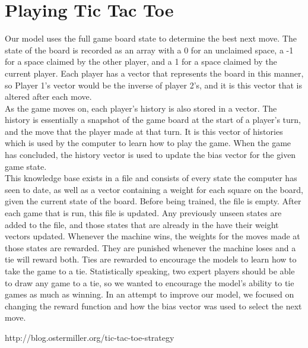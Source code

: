 \documentclass{article}
\begin{document}
\section{Playing Tic Tac Toe}
Our model uses the full game board state to determine the best next move. The state of the board is recorded as an array with a 0 for an unclaimed space, a -1 for a space claimed by the other player, and a 1 for a space claimed by the current player. Each player has a vector that represents the board in this manner, so Player 1's vector would be the inverse of player 2's, and it is this vector that is altered after each move. \\
As the game moves on, each player's history is also stored in a vector. The history is essentially a snapshot of the game board at the start of a player's turn, and the move that the player made at that turn. It is this vector of histories which is used by the computer to learn how to play the game. When the game has concluded, the history vector is used to update the bias vector for the given game state. \\
This knowledge base exists in a file and consists of every state the computer has seen to date, as well as a vector containing a weight for each square on the board, given the current state of the board. Before being trained, the file is empty. After each game that is run, this file is updated. Any previously unseen states are added to the file, and those states that are already in the have their weight vectors updated. Whenever the machine wins, the weights for the moves made at those states are rewarded. They are punished whenever the machine loses and a tie will reward both. Ties are rewarded to encourage the models to learn how to take the game to a tie. Statistically speaking, two expert players should be able to draw any game to a tie, so we wanted to encourage the model's ability to tie games as much as winning. In an attempt to improve our model, we focused on changing the reward function and how the bias vector was used to select the next move.  

http://blog.ostermiller.org/tic-tac-toe-strategy
 
\end{document}
